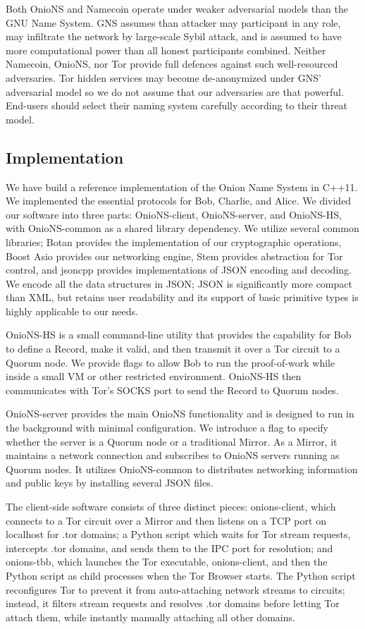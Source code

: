 \documentclass[conference]{IEEEtran}
\begin{document}
Both OnioNS and Namecoin operate under weaker adversarial models than the GNU Name System. GNS assumes than attacker may participant in any role, may infiltrate the network by large-scale Sybil attack, and is assumed to have more computational power than all honest participants combined. Neither Namecoin, OnioNS, nor Tor provide full defences against such well-resourced adversaries. Tor hidden services may become de-anonymized under GNS' adversarial model so we do not assume that our adversaries are that powerful. End-users should select their naming system carefully according to their threat model.

\subsection{Implementation}

We have build a reference implementation of the Onion Name System in C++11. We implemented the essential protocols for Bob, Charlie, and Alice. We divided our software into three parts: OnioNS-client, OnioNS-server, and OnioNS-HS, with OnioNS-common as a shared library dependency. We utilize several common libraries; Botan\cite{BotanLib} provides the implementation of our cryptographic operations, Boost Asio\cite{AsioLib} provides our networking engine, Stem provides abstraction for Tor control, and jsoncpp\cite{JsonCppLib} provides implementations of JSON encoding and decoding. We encode all the data structures in JSON; JSON is significantly more compact than XML, but retains user readability and its support of basic primitive types is highly applicable to our needs. 

OnioNS-HS is a small command-line utility that provides the capability for Bob to define a Record, make it valid, and then transmit it over a Tor circuit to a Quorum node. We provide flags to allow Bob to run the proof-of-work while inside a small VM or other restricted environment. OnioNS-HS then communicates with Tor's SOCKS port to send the Record to Quorum nodes.

OnioNS-server provides the main OnioNS functionality and is designed to run in the background with minimal configuration. We introduce a flag to specify whether the server is a Quorum node or a traditional Mirror. As a Mirror, it maintains a network connection and subscribes to OnioNS servers running as Quorum nodes. It utilizes OnioNS-common to distributes networking information and public keys by installing several JSON files.

The client-side software consists of three distinct pieces: onions-client, which connects to a Tor circuit over a Mirror and then listens on a TCP port on localhost for .tor domains; a Python script which waits for Tor stream requests, intercepts .tor domains, and sends them to the IPC port for resolution; and onions-tbb, which launches the Tor executable, onions-client, and then the Python script as child processes when the Tor Browser starts. The Python script reconfigures Tor to prevent it from auto-attaching network streams to circuits; instead, it filters stream requests and resolves .tor domains before letting Tor attach them, while instantly manually attaching all other domains.
\end{document}
